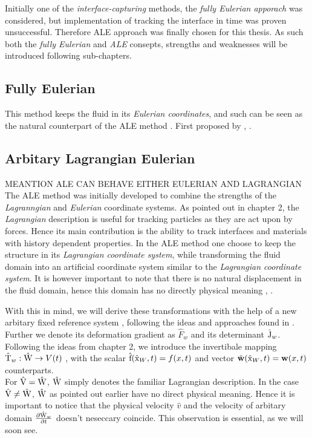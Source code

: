 Initially one of the \textit{interface-capturing } methods, the \textit{fully Eulerian apporach } was considered, but implementation of tracking the interface in time was proven unsuccessful. Therefore ALE approach was finally chosen for this thesis. As such both the \textit{fully Eulerian} and \textit{ALE} consepts, strengths and weaknesses will be introduced following sub-chapters. \\

\subsection{Fully Eulerian}
This method keeps the fluid in its \textit{Eulerian coordinates}, and such can be seen as the natural counterpart of the ALE method \cite{Wick2013}. First proposed by , \cite{Dunne2006}.

\subsection{Arbitary Lagrangian Eulerian}
MEANTION ALE CAN  BEHAVE EITHER EULERIAN AND LAGRANGIAN
The ALE method was initially developed to combine the strengths of the \textit{Lagranngian} and \textit{Eulerian} coordinate systems. As pointed out in chapter 2, the \textit{Lagrangian} description is useful for tracking particles as they are act upon by forces. Hence its main contribution is the ability to track interfaces and materials with history dependent properties.
In the ALE method one choose to keep the structure in its \textit{Lagrangian coordinate system}, while transforming the fluid domain into an artificial coordinate system similar to the \textit{Lagrangian coordinate system}. It is however important to note that there is no natural displacement in the fluid domain, hence this domain has no directly physical meaning \cite{Richter2010a}, \cite{Donea2004}. 
 
With this in mind, we will derive these transformations with the help of a new arbitary fixed reference system , following the ideas and approaches found in \cite{Richter2016}. Further we denote its deformation gradient as $\hat{F}_w$ and its determinant $\text{\^{J}}_w$. Following the ideas from chapter 2, we introduce the invertibale mapping $\text{\^{T}}_w : \text{\^{W}} \rightarrow V(t)$ , with the scalar $\text{\^{f}}(\text{\^{x}}_W, t) = f(x,t) $ and vector $\hat{w}(\ha{x}_W, t) = \mathbf{w}(x,t) $ counterparts.\\ 
For $\text{\^{V}} = \text{\^{W}}$, $\text{\^{W}}$ simply denotes the familiar Lagrangian description.
In the case $\text{\^{V}} \neq \text{\^{W}}$, $\text{\^{W}}$ as pointed out earlier have no direct physical meaning.  Hence it is important to notice that the physical velocity $\hat{v}$ and the velocity of arbitary domain $\frac{\partial \text{\^{W}}_w}{\partial t}$ doesn't neseccary coincide. This observation is essential, as we will soon see. \\

